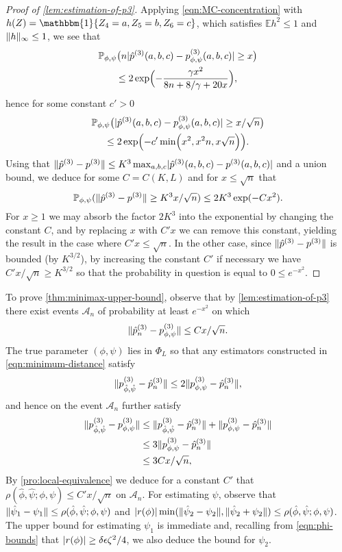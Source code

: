 \documentclass[journal]{IEEEtran}
\newcommand{\1}{\boldsymbol{1}}
\newcommand{\EE}{\mathbb{E}}
\newcommand{\PP}{\mathbb{P}}
\DeclarePairedDelimiter{\braces}{\{}{\}}
\DeclarePairedDelimiter{\brackets}{(}{)}
\DeclarePairedDelimiter{\norm}{\lVert}{\rVert}
\DeclarePairedDelimiter{\abs}{\lvert}{\rvert}
\newcommand{\II}{\mathbbm{1}}
\begin{document}
\begin{proof}[Proof of \cref{lem:estimation-of-p3}]
	Applying \cref{eqn:MC-concentration} with $h(Z)=\II\braces{Z_4=a,Z_5=b,Z_6=c}$, which satisfies $\EE h^2 \leq 1$ and $\norm{h}_\infty \leq 1$, we see that
        \begin{multline*}
          \PP_{\phi,\psi}\brackets[\big]{ n \abs{\hat{p}^{(3)}(a,b,c)-p_{\phi,\psi}^{(3)}(a,b,c)}\geq x}\\
          \leq 2\exp \brackets[\Big]{-\frac{\gamma x^2 }{8n+8/\gamma +20x}},
        \end{multline*}
	hence for some constant $c'>0$
        \begin{multline*}
          \PP_{\phi,\psi}\brackets[\big]{ \abs{\hat{p}^{(3)}(a,b,c)-p_{\phi,\psi}^{(3)}(a,b,c)}\geq x/\sqrt{n}}\\
          \leq 2\exp\brackets[\Big]{-c' \min \brackets[\Big]{x^2,x^2 n,x\sqrt{n}}}.
        \end{multline*}
	Using that $\norm{\hat{p}^{(3)}-p^{(3)}}\leq K^3\max_{a,b,c}\abs{\hat{p}^{(3)}(a,b,c)-p^{(3)}(a,b,c)}$ and a union bound, we deduce for some $C=C(K,L)$ and for $x\leq \sqrt{n}$ that
	\[ \PP_{\phi,\psi}(\norm{\hat{p}^{(3)}-p^{(3)}}\geq K^3 x/\sqrt{n})\leq 2K^3\exp(-Cx^2).\]
	For $x\geq 1$ we may absorb the factor $2K^3$ into the exponential by changing the constant $C$, and by replacing $x$ with $C'x$ we can remove this constant, yielding the result in the case where $C'x \leq \sqrt{n}$. In the other case, since $\norm{\hat{p}^{(3)}-p^{(3)}}$ is bounded (by $K^{3/2}$), by increasing the constant $C'$ if necessary we have $C'x/\sqrt{n}\geq K^{3/2}$ so that the probability in question is equal to $0\leq e^{-x^2}$.
\end{proof}

To prove \cref{thm:minimax-upper-bound}, observe that by \cref{lem:estimation-of-p3} there exist events $\mathcal{A}_n$ of probability at least $e^{-x^2}$ on which
\[ \norm{\hat{p}^{(3)}_n-p_{\phi,\psi}^{(3)}}\leq Cx/\sqrt{n}.\]
The true parameter $(\phi,\psi)$ lies in $\Phi_L$ so that any estimators constructed in \cref{eqn:minimum-distance} satisfy
\[ \norm{p^{(3)}_{\hat{\phi},\hat{\psi}}-\hat{p}^{(3)}_n} \leq 2\norm{p^{(3)}_{\phi,\psi}-\hat{p}^{(3)}_n},\]
and hence on the event $\mathcal{A}_n$ further satisfy
\begin{align*}
  \norm{ p^{(3)}_{\hat{\phi},\hat{\psi}} - p^{(3)}_{\phi,\psi}}
  &\leq \norm{p^{(3)}_{\hat{\phi},\hat{\psi}}-\hat{p}^{(3)}_n}+\norm{p^{(3)}_{\phi,\psi}-\hat{p}^{(3)}_n}\\
  &\leq 3\norm{p^{(3)}_{\phi,\psi}-\hat{p}^{(3)}_n}\\
  &\leq 3Cx/\sqrt{n},
\end{align*}
By \cref{pro:local-equivalence} we deduce for a constant $C'$ that $\rho(\hat{\phi},\hat{\psi};\phi,\psi)\leq C'x/\sqrt{n}$ on $\mathcal{A}_n$.
For estimating $\psi$, observe that $\norm{\hat{\psi}_1-\psi_1}\leq \rho(\hat{\phi},\hat{\psi};\phi,\psi)$ and $\abs{r(\phi)}\min(\norm{\hat{\psi}_2-\psi_2},\norm{\hat{\psi}_2+\psi_2})\leq \rho(\hat{\phi},\hat{\psi};\phi,\psi)$. The upper bound for estimating $\psi_1$ is immediate and, recalling from \cref{eqn:phi-bounds} that $\abs{r(\phi)}\geq \delta\epsilon\zeta^2/4$, we also deduce the bound for $\psi_2$.
\end{document}
